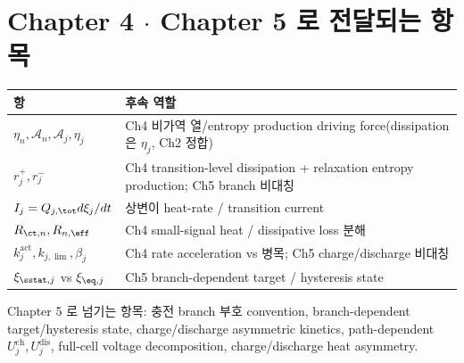 \section{Chapter 4 $\cdot$ Chapter 5 로 전달되는 항목}\label{sec:ch3_transmit}
\begin{longtable}{p{} p{}}
\toprule 항 & 후속 역할 \\ \midrule \endhead
$\eta_n,\mathcal A_n,\mathcal A_j,\eta_j$ & Ch4 비가역 열/entropy production driving force(dissipation 은 $\eta_j$, Ch2 정합) \\
$r_j^+,r_j^-$ & Ch4 transition-level dissipation + relaxation entropy production; Ch5 branch 비대칭 \\
$I_j=Q_{j,\tot}d\xi_j/dt$ & 상변이 heat-rate / transition current \\
$R_{\ct,n},R_{n,\eff}$ & Ch4 small-signal heat / dissipative loss 분해 \\
$k_j^{\mathrm{act}},k_{j,\lim},\beta_j$ & Ch4 rate acceleration vs 병목; Ch5 charge/discharge 비대칭 \\
$\xi_{\sstat,j}$ vs $\xi_{\eq,j}$ & Ch5 branch-dependent target / hysteresis state \\
\bottomrule
\end{longtable}
Chapter 5 로 넘기는 항목: 충전 branch 부호 convention, branch-dependent target/hysteresis state,
charge/discharge asymmetric kinetics, path-dependent $U_j^{\mathrm{ch}},U_j^{\mathrm{dis}}$, full-cell
voltage decomposition, charge/discharge heat asymmetry.

